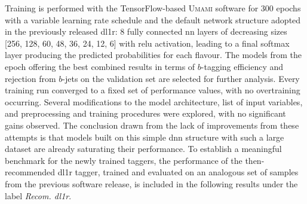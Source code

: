 
Training is performed with the TensorFlow-based \cite{tensorflow2015-whitepaper} \textsc{Umami} software \cite{UmamiCite} for 300 epochs with a variable learning rate schedule and the default network structure adopted in the previously released \gls{dl1r}: 8 fully connected \gls{nn} layers of decreasing sizes [256, 128, 60, 48, 36, 24, 12, 6] with \gls{relu} activation, leading to a final softmax layer producing the predicted probabilities for each flavour. The models from the epoch offering the best combined results in terms of $b$-tagging efficiency and rejection from $b$-jets on the validation set are selected for further analysis. Every training run converged to a fixed set of performance values, with no overtraining occurring. Several modifications to the model architecture, list of input variables, and preprocessing and training procedures were explored, with no significant gains observed. The conclusion drawn from the lack of improvements from these attempts is that models built on this simple \gls{dnn} structure with such a large dataset are already saturating their performance. To establish a meaningful benchmark for the newly trained taggers, the performance of the then-recommended \gls{dl1r} tagger, trained and evaluated on an analogous set of samples from the previous software release, is included in the following results under the label \textit{Recom. \gls{dl1r}}. \\

